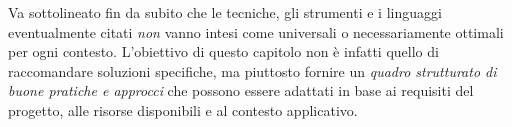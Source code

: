 Va sottolineato fin da subito che le tecniche, gli strumenti e i linguaggi
eventualmente citati \textit{non} vanno intesi come universali o necessariamente
ottimali per ogni contesto. L'obiettivo di questo capitolo non è infatti quello
di raccomandare soluzioni specifiche, ma piuttosto fornire un \textit{quadro
strutturato di buone pratiche e approcci} che possono essere adattati in base ai
requisiti del progetto, alle risorse disponibili e al contesto applicativo.





